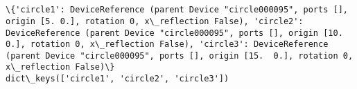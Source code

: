 \documentclass[11pt]{article}
\begin{document}
    \begin{center}
    \end{center}
    { \hspace*{\fill} \\}
    
    \begin{center}
    \end{center}
    { \hspace*{\fill} \\}
    
    \begin{Verbatim}[commandchars=\\\{\}]
\{'circle1': DeviceReference (parent Device "circle000095", ports [], origin [5. 0.], rotation 0, x\_reflection False), 'circle2': DeviceReference (parent Device "circle000095", ports [], origin [10.  0.], rotation 0, x\_reflection False), 'circle3': DeviceReference (parent Device "circle000095", ports [], origin [15.  0.], rotation 0, x\_reflection False)\}
dict\_keys(['circle1', 'circle2', 'circle3'])

    \end{Verbatim}
\end{document}

